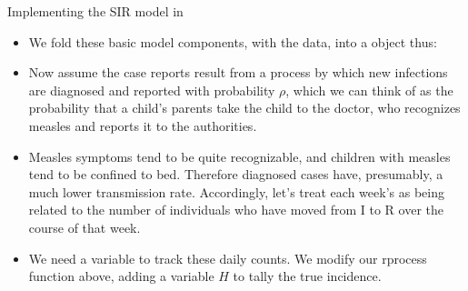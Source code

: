 \begin{frame}{Implementing the SIR model in }
\begin{itemize}
\begin{knitrout}\small
{}\color{fgcolor}\begin{kframe}
\begin{alltt}
 \hlkwb{<-} \hlstd{(}\hlstd{,} \hlstd{,} \hlstd{) \{}
  \hlstd{(} \hlstd{=} \hlopt{*}  \hlstd{=} \hlstd{,}  \hlstd{=} \hlopt{*}\hlstd{(}\hlopt{-}
\hlstd{\}}
\end{alltt}
\end{kframe}
\end{knitrout}
  
\item We fold these basic model components, with the data, into a  object thus:

\begin{knitrout}\small
{}\color{fgcolor}
\end{knitrout}
  
\item Now assume the case reports result from a process by which new infections are diagnosed and reported with probability $\rho$, which we can think of as the probability that a child's parents take the child to the doctor, who recognizes measles and reports it to the authorities.

\item Measles symptoms tend to be quite recognizable, and children with measles tend to be confined to bed. Therefore diagnosed cases have, presumably, a much lower transmission rate.
  Accordingly, let's treat each week's  as being related to the number of individuals who have moved from I to R over the course of that week.

\item We need a variable to track these daily counts.
  We modify our rprocess function above, adding a variable $H$ to tally the true incidence.


\end{itemize}
\end{frame}
